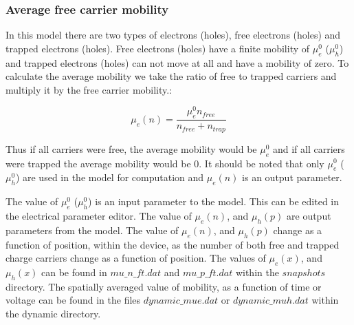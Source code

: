 \subsubsection{Average free carrier mobility}
In this model there are two types of electrons (holes), free electrons (holes) and trapped electrons (holes).  Free electrons (holes) have a finite mobility of $\mu_e^0$ ($\mu_h^0$) and trapped electrons (holes) can not move at all and have a mobility of zero.  To calculate the average mobility we take the ratio of free to trapped carriers and multiply it by the free carrier mobility.:

\begin{equation}
\mu_e(n)=\frac{\mu_e^0 n_{free}}{n_{free}+n_{trap}}
\end{equation}

Thus if all carriers were free, the average mobility would be $\mu_e^0$ and if all carriers were trapped the average mobility would be 0.  It should be noted that only $\mu_e^0$ ($\mu_h^0$) are used in the model for computation and $\mu_e(n)$ is an output parameter.

The value of $\mu_e^0$ ($\mu_h^0$) is an input parameter to the model.  This can be edited in the electrical parameter editor.  The value of $\mu_e(n)$, and $\mu_h(p)$ are output parameters from the model.  The value of $\mu_e(n)$, and $\mu_h(p)$ change as a function of position, within the device, as the number of both free and trapped charge carriers change as a function of position.  The values of  $\mu_e(x)$, and $\mu_h(x)$ can be found in $mu\_n\_ft.dat$ and $mu\_p\_ft.dat$ within the $snapshots$ directory.  The spatially averaged value of mobility, as a function of time or voltage can be found in the files $dynamic\_mue.dat$ or $dynamic\_muh.dat$ within the dynamic directory.

